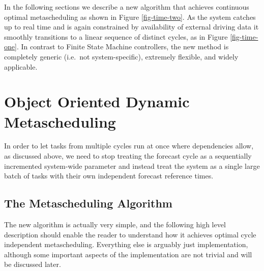 \documentclass[11pt,a4paper]{article}
\begin{document}
In the following sections we describe a new algorithm that achieves
continuous optimal metascheduling as shown in Figure \ref{fig-time-two}.
As the system catches up to real time and is again constrained by
availability of external driving data it smoothly transitions to a
linear sequence of distinct cycles, as in Figure \ref{fig-time-one}. In
contrast to Finite State Machine controllers, the new method is
completely generic (i.e.\ not system-specific), extremely flexible, and
widely applicable.  



\section{Object Oriented Dynamic Metascheduling}

In order to let tasks from multiple cycles run at once where
dependencies allow, as discussed above, we need to stop treating the
forecast cycle as a sequentially incremented system-wide
parameter and instead treat the system as a single large batch of tasks
with their own independent forecast reference times. 


\subsection{The Metascheduling Algorithm}

The new algorithm is actually very simple, and the following high level
description should enable the reader to understand how it achieves
optimal cycle independent metascheduling. Everything else is arguably
just implementation, although some important aspects of the
implementation are not trivial and will be discussed later.
\end{document}
